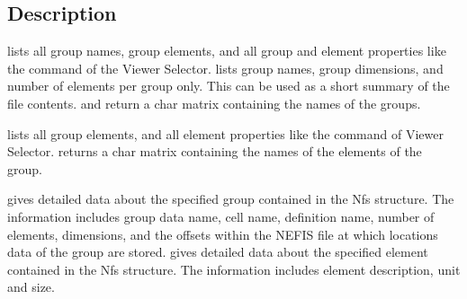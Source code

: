 \subsection*{Description}
 lists all group names, group elements, and all group and element properties like the  command of the Viewer Selector.
 lists group names, group dimensions, and number of elements per group only.
This can be used as a short summary of the file contents.
 and  return a char matrix containing the names of the groups.

 lists all group elements, and all element properties like the  command of Viewer Selector.
 returns a char matrix containing the names of the elements of the group.

 gives detailed data about the specified group contained in the Nfs structure.
The information includes group data name, cell name, definition name, number of elements, dimensions, and the offsets within the NEFIS file at which locations data of the group are stored.
 gives detailed data about the specified element contained in the Nfs structure.
The information includes element description, unit and size.

